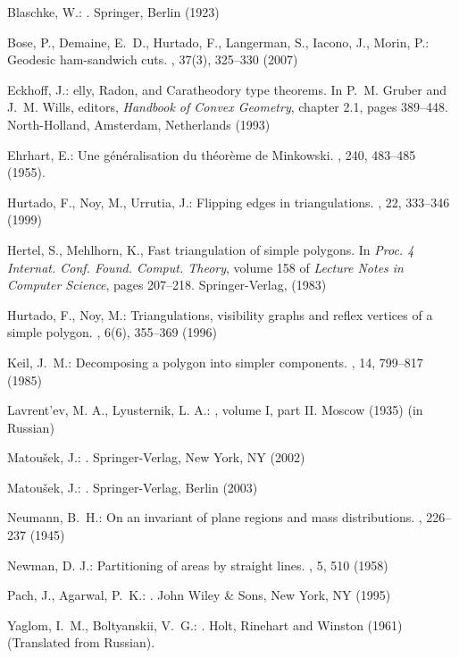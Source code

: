 \documentclass{birkjour}
\begin{document}
\begin{thebibliography}{10}

Blaschke, W.:
.
\newblock Springer, Berlin (1923)

Bose, P., Demaine, E.~D., Hurtado, F., Langerman, S., Iacono, J., Morin, P.:
\newblock Geodesic ham-sandwich cuts.
, 37(3), 325--330 (2007)

Eckhoff, J.:
elly, {R}adon, and {C}aratheodory type theorems.
\newblock In P.~M. Gruber and J.~M. Wills, editors, {\it Handbook of Convex
  Geometry}, chapter 2.1, pages 389--448. North-Holland, Amsterdam,
  Netherlands (1993)

Ehrhart, E.:
\newblock Une g\'en\'eralisation du th\'eor\`eme de {M}inkowski.
, 240, 483--485 (1955).

Hurtado, F., Noy, M., Urrutia, J.:
\newblock Flipping edges in triangulations.
, 22, 333--346 (1999)

Hertel, S., Mehlhorn, K.,
\newblock Fast triangulation of simple polygons.
\newblock In {\it Proc. 4 Internat. Conf. Found. Comput. Theory}, volume 158 of
  {\it Lecture Notes in Computer Science}, pages 207--218. Springer-Verlag,
  (1983)

Hurtado, F., Noy, M.:
\newblock Triangulations, visibility graphs and reflex vertices of a simple
  polygon.
, 6(6), 355--369 (1996)

Keil, J.~M.:
\newblock Decomposing a polygon into simpler components.
, 14, 799--817 (1985)

Lavrent'ev, M. A., Lyusternik, L. A.:
, volume I, part II.
\newblock Moscow (1935)
\newblock (in Russian)

Matou{\v s}ek, J.:
.
\newblock Springer-Verlag, New York, NY (2002)

Matou{\v s}ek, J.:
.
\newblock Springer-Verlag, Berlin (2003)

Neumann, B.~H.:
\newblock On an invariant of plane regions and mass distributions.
, 226--237 (1945)

Newman, D. J.:
\newblock Partitioning of areas by straight lines.
, 5, 510 (1958)

Pach, J., Agarwal, P.~K.:
.
\newblock John Wiley {\&} Sons, New York, NY (1995)

Yaglom, I.~M.,  Boltyanskii, V.~G.:
.
\newblock Holt, Rinehart and Winston (1961)
\newblock (Translated from Russian).

\end{thebibliography}
\end{document}
